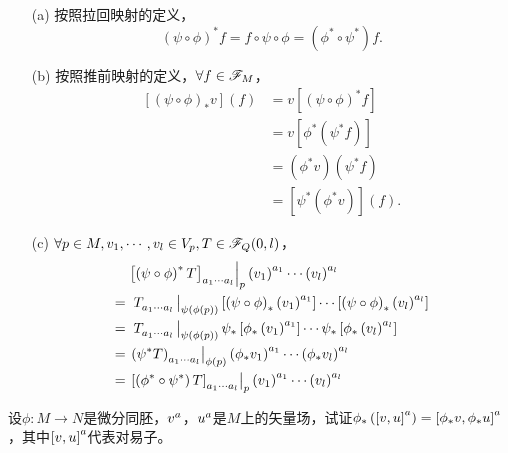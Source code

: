 \begin{xiti}
	\begin{zm}
		\begin{enumerate}
			\item[(a)] 按照拉回映射的定义，
			\begin{displaymath}
			\left( \psi \circ \phi \right)^* f= f \circ \psi \circ \phi = \left( \phi^* \circ \psi^*\right) f.
			\end{displaymath}
			\item[(b)] 按照推前映射的定义，$\forall f\in \mathscr{F}_M $，
			\begin{align*}
			\left[\left(\psi\circ\phi\right)_* v \right] (f) &= v \left[ \left( \psi \circ \phi \right)^* f \right]\\
			&= v \left[\phi^*\left( \psi^* f \right) \right]\\
			&= \left( \phi^* v \right) \left( \psi^* f \right)\\
			&= \left[ \psi^* \left(\phi^* v\right) \right] (f).
			\end{align*}
			\item[(c)] $\forall p\in M, v_1,\cdots,v_l \in V_p ,T\in \mathscr{F}_Q(0,l)$，
			\begin{align*}
			&\left. \tensor{\left[\left(\psi\circ\phi\right)^* T\right]  }{_{a_1\cdots a_l}} \right|_p \tensor{\left(v_1\right)}{^{a_1}} \cdots \tensor{\left(v_l\right)}{^{a_l}}\\
			=&\; \left. \tensor{T}{_{a_1 \cdots a_l}} \right|_{\psi(\phi(p))} \left[\left(\psi\circ\phi \right)_* \tensor{\left(v_1\right)}{^{a_1}}\right] \cdots \left[\left(\psi\circ\phi \right)_* \tensor{\left(v_l\right)}{^{a_l}}\right]\\
			=&\; \left. \tensor{T}{_{a_1 \cdots a_l}} \right|_{\psi(\phi(p))} \psi_* \left[\phi_* \tensor{\left(v_1\right)}{^{a_1}}\right] \cdots \psi_* \left[\phi_* \tensor{\left(v_l\right)}{^{a_l}}\right]\\
			=&\tmu \left. \tensor{\left( \psi^* T \right)}{_{a_1\cdots a_l}} \right|_{\phi(p)} \tensor{\left( \phi_* v_1 \right)}{^{a_1}} \cdots \tensor{\left( \phi_* v_l \right)}{^{a_l}}\\
			=&\tmu \left. \tensor{\left[\left( \phi^* \circ \psi^* \right) T\right]  }{_{a_1\cdots a_l}} \right|_p \tensor{\left(v_1\right)}{^{a_1}} \cdots \tensor{\left(v_l\right)}{^{a_l}}
			\end{align*}
		\end{enumerate}
	\end{zm}
	
	\item 设$\phi\colon M \rightarrow N $是微分同胚，$\tensor{v}{^a}$，$\tensor{u}{^a}$是$M$上的矢量场，试证$\phi_*\left( \tensor{\left[ v,u \right]}{^a} \right)= \tensor{\left[\phi_* v,\phi_* u \right]}{^a}$，其中$\tensor{\left[v,u \right]}{^a}$代表对易子。
	

\end{xiti}
